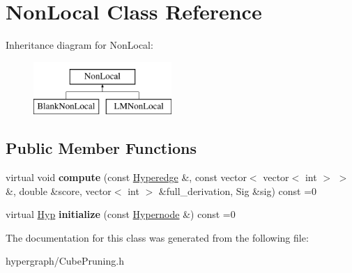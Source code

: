 \hypertarget{class_non_local}{
\section{NonLocal Class Reference}
\label{class_non_local}
}
Inheritance diagram for NonLocal:\begin{figure}[H]
\begin{center}
\leavevmode
\includegraphics[height=2cm]{class_non_local}
\end{center}
\end{figure}
\subsection*{Public Member Functions}
\begin{DoxyCompactItemize}
\item 
\hypertarget{class_non_local_acd66e7882a5bb3415d3fd658d03ec8fc}{
virtual void {\bfseries compute} (const \hyperlink{class_scarab_1_1_h_g_1_1_hyperedge}{Hyperedge} \&, const vector$<$ vector$<$ int $>$ $>$ \&, double \&score, vector$<$ int $>$ \&full\_\-derivation, Sig \&sig) const =0}
\label{class_non_local_acd66e7882a5bb3415d3fd658d03ec8fc}

\item 
\hypertarget{class_non_local_a90f2d399853f5c689a0abdc5c12a8370}{
virtual \hyperlink{struct_hyp}{Hyp} {\bfseries initialize} (const \hyperlink{class_scarab_1_1_h_g_1_1_hypernode}{Hypernode} \&) const =0}
\label{class_non_local_a90f2d399853f5c689a0abdc5c12a8370}

\end{DoxyCompactItemize}


The documentation for this class was generated from the following file:\begin{DoxyCompactItemize}
\item 
hypergraph/CubePruning.h\end{DoxyCompactItemize}
